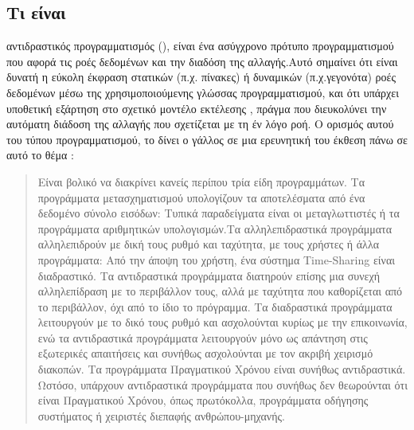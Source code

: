\subsection*{Τι είναι}
 αντιδραστικός προγραμματισμός (), είναι ένα ασύγχρονο πρότυπο προγραμματισμού που αφορά τις ροές δεδομένων και την διαδόση της αλλαγής.Αυτό σημαίνει ότι είναι δυνατή η εύκολη έκφραση στατικών (π.χ. πίνακες) ή δυναμικών (π.χ.γεγονότα) ροές δεδομένων μέσω της χρησιμοποιούμενης γλώσσας προγραμματισμού, και ότι υπάρχει υποθετική εξάρτηση στο σχετικό μοντέλο εκτέλεσης , πράγμα που διευκολύνει την αυτόματη διάδοση της αλλαγής που σχετίζεται με τη έν λόγο ροή.
Ο ορισμός αυτού του τύπου προγραμματισμού, το δίνει ο γάλλος  σε μια ερευνητική του έκθεση πάνω σε αυτό το θέμα :
\blockquote{Είναι βολικό να διακρίνει κανείς περίπου τρία είδη προγραμμάτων. Τα προγράμματα μετασχηματισμού υπολογίζουν τα αποτελέσματα από ένα δεδομένο σύνολο εισόδων: Τυπικά παραδείγματα είναι οι μεταγλωττιστές ή τα προγράμματα αριθμητικών υπολογισμών.Τα αλληλεπιδραστικά προγράμματα αλληλεπιδρούν με δική τους ρυθμό και ταχύτητα, με τους χρήστες ή άλλα προγράμματα: Από την άποψη του χρήστη, ένα σύστημα \textlatin{Time-Sharing} είναι διαδραστικό. Τα αντιδραστικά προγράμματα διατηρούν επίσης μια συνεχή αλληλεπίδραση με το περιβάλλον τους, αλλά με ταχύτητα που καθορίζεται από το περιβάλλον, όχι από το ίδιο το πρόγραμμα. Τα διαδραστικά προγράμματα λειτουργούν με το δικό τους ρυθμό και ασχολούνται κυρίως με την επικοινωνία, ενώ τα αντιδραστικά προγράμματα λειτουργούν μόνο ως απάντηση στις εξωτερικές απαιτήσεις και συνήθως ασχολούνται με τον ακριβή χειρισμό διακοπών. Τα προγράμματα Πραγματικού Χρόνου είναι συνήθως αντιδραστικά. Ωστόσο, υπάρχουν αντιδραστικά προγράμματα που συνήθως δεν θεωρούνται ότι είναι Πραγματικού Χρόνου, όπως πρωτόκολλα, προγράμματα οδήγησης συστήματος ή χειριστές διεπαφής ανθρώπου-μηχανής.}

